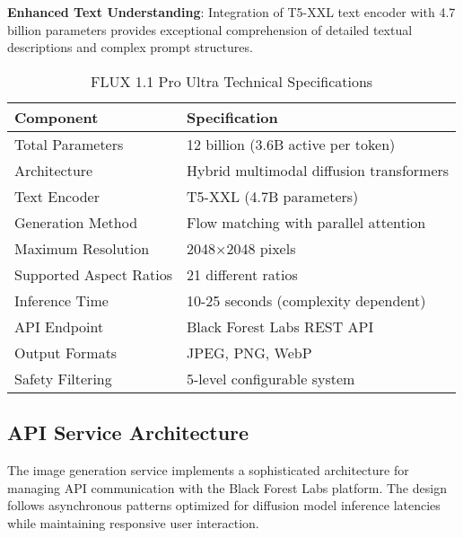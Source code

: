 \textbf{Enhanced Text Understanding}: Integration of T5-XXL text encoder with 4.7 billion parameters provides exceptional comprehension of detailed textual descriptions and complex prompt structures.

\begin{table}[H]
\centering
\caption{FLUX 1.1 Pro Ultra Technical Specifications}
\label{tab:flux_technical_specs}
{\begin{tabular}{ll}
\toprule
\textbf{Component} & \textbf{Specification} \\
\midrule
Total Parameters & 12 billion (3.6B active per token) \\
Architecture & Hybrid multimodal diffusion transformers \\
Text Encoder & T5-XXL (4.7B parameters) \\
Generation Method & Flow matching with parallel attention \\
Maximum Resolution & 2048×2048 pixels \\
Supported Aspect Ratios & 21 different ratios \\
Inference Time & 10-25 seconds (complexity dependent) \\
API Endpoint & Black Forest Labs REST API \\
Output Formats & JPEG, PNG, WebP \\
Safety Filtering & 5-level configurable system \\
\bottomrule
\end{tabular}}
\end{table}

\subsection{API Service Architecture}

The image generation service implements a sophisticated architecture for managing API communication with the Black Forest Labs platform. The design follows asynchronous patterns optimized for diffusion model inference latencies while maintaining responsive user interaction.

